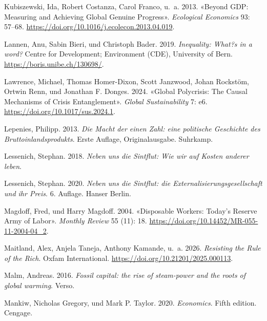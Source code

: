 \documentclass[
  nswissgerman,
  a4paper,
  DIV=11,
  numbers=noendperiod,
  oneside,
  openany]{scrreprt}
\newlength{\cslhangindent}
\newenvironment{CSLReferences}[2] %
 {\begin{list}{}{%
  \setlength{\itemindent}{0pt}
  \setlength{\leftmargin}{0pt}
  \setlength{\parsep}{0pt}
  \ifodd #1
   \setlength{\leftmargin}{\cslhangindent}
   \setlength{\itemindent}{-1\cslhangindent}
  \fi
  \setlength{\itemsep}{#2\baselineskip}}}
 {\end{list}}
\begin{document}
\begin{CSLReferences}{1}{1}
Kubiszewski, Ida, Robert Costanza, Carol Franco, u.~a. 2013. {«Beyond
GDP: Measuring and Achieving Global Genuine Progress»}. \emph{Ecological
Economics} 93: 57--68.
\url{https://doi.org/10.1016/j.ecolecon.2013.04.019}.

Lannen, Anu, Sabin Bieri, und Christoph Bader. 2019. \emph{Inequality:
What?s in a word?} Centre for Development; Environment (CDE), University
of Bern. \url{https://boris.unibe.ch/130698/}.

Lawrence, Michael, Thomas Homer-Dixon, Scott Janzwood, Johan Rockstöm,
Ortwin Renn, und Jonathan F. Donges. 2024. {«Global Polycrisis: The
Causal Mechanisms of Crisis Entanglement»}. \emph{Global Sustainability}
7: e6. \url{https://doi.org/10.1017/sus.2024.1}.

Lepenies, Philipp. 2013. \emph{Die Macht der einen Zahl: eine politische
Geschichte des Bruttoinlandsprodukts}. Erste Auflage, Originalausgabe.
Suhrkamp.

Lessenich, Stephan. 2018. \emph{Neben uns die Sintflut: Wie wir auf
Kosten anderer leben}.

Lessenich, Stephan. 2020. \emph{Neben uns die Sintflut: die
Externalisierungsgesellschaft und ihr Preis}. 6. Auflage. Hanser Berlin.

Magdoff, Fred, und Harry Magdoff. 2004. {«Disposable Workers: Today's
Reserve Army of Labor»}. \emph{Monthly Review} 55 (11): 18.
\url{https://doi.org/10.14452/MR-055-11-2004-04_2}.

Maitland, Alex, Anjela Taneja, Anthony Kamande, u.~a. 2026.
\emph{Resisting the {Rule} of the {Rich}}. Oxfam International.
\url{https://doi.org/10.21201/2025.000113}.

Malm, Andreas. 2016. \emph{Fossil capital: the rise of steam-power and
the roots of global warming}. Verso.

Mankiw, Nicholas Gregory, und Mark P. Taylor. 2020. \emph{Economics}.
Fifth edition. Cengage.


\end{CSLReferences}
\end{document}
